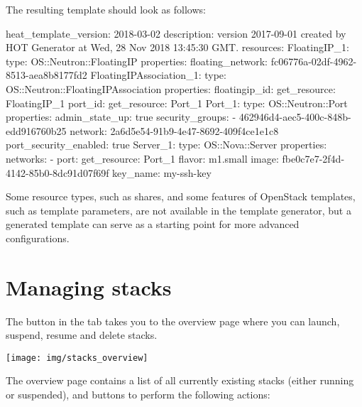 The resulting template should look as follows:

\begin{code}{}
heat_template_version: 2018-03-02
description: version 2017-09-01 created by HOT Generator at Wed, 28 Nov 2018 13:45:30 GMT.
resources:
  FloatingIP_1:
    type: OS::Neutron::FloatingIP
    properties:
      floating_network: fc06776a-02df-4962-8513-aea8b8177fd2
  FloatingIPAssociation_1:
    type: OS::Neutron::FloatingIPAssociation
    properties:
      floatingip_id: { get_resource: FloatingIP_1 }
      port_id: { get_resource: Port_1 }
  Port_1:
    type: OS::Neutron::Port
    properties:
      admin_state_up: true
      security_groups:
        - 462946d4-aec5-400c-848b-edd916760b25
      network: 2a6d5e54-91b9-4e47-8692-409f4ce1e1c8
      port_security_enabled: true
  Server_1:
    type: OS::Nova::Server
    properties:
      networks:
        - port: { get_resource: Port_1 }
      flavor: m1.small
      image: fbe0c7e7-2f4d-4142-85b0-8dc91d07f69f
      key_name: my-ssh-key
\end{code}

Some resource types, such as shares, and some features of OpenStack
templates, such as template parameters, are not available in the
template generator, but a generated template can serve as a starting
point for more advanced configurations.

\section{Managing stacks}\label{sec:managing-stacks}
The  button in the  tab takes you
to the overview page where you can launch, suspend, resume and delete
stacks.
\begin{center}
  \texttt{[image: img/stacks\_overview]}
\end{center}
The overview page contains a list of all currently existing stacks
(either running or suspended), and buttons to perform the following
actions:

